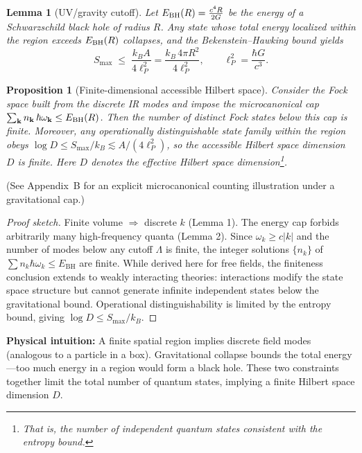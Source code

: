 \documentclass[12pt]{article}
\newcommand{\Smax}{S_{\max}}
\newtheorem{lemma}{Lemma}
\newtheorem{proposition}{Proposition}
\theoremstyle{remark}
\begin{document}
\begin{lemma}[UV/gravity cutoff]\label{lem:UV}
Let $E_{\rm BH}(R)=\frac{c^4 R}{2G}$ be the energy of a Schwarzschild black hole of radius $R$. 
Any state whose total energy localized within the region exceeds $E_{\rm BH}(R)$ collapses, and the
Bekenstein--Hawking bound yields
\begin{equation}
\Smax\;\le\; \frac{k_B A}{4\ell_P^2}
=\frac{k_B\,4\pi R^2}{4\ell_P^2},\qquad \ell_P^2=\frac{\hbar G}{c^3}.
\end{equation}
\end{lemma}

\begin{proposition}[Finite-dimensional accessible Hilbert space]\label{prop:finiteD}
Consider the Fock space built from the discrete IR modes and impose the microcanonical cap 
$\sum_{\mathbf{k}} n_{\mathbf{k}}\,\hbar\omega_{\mathbf{k}}\le E_{\rm BH}(R)$. 
Then the number of distinct Fock states below this cap is finite. 
Moreover, any operationally distinguishable state family within the region obeys 
$\log D \le \Smax/k_B \lesssim A/(4\ell_P^2)$, so the accessible Hilbert space dimension $D$ is finite. Here $D$ denotes the effective Hilbert space dimension\footnote{That is, the number of independent quantum states consistent with the entropy bound.}.

\end{proposition}
\noindent(See Appendix~B for an explicit microcanonical counting illustration under a gravitational cap.)

\begin{proof}[Proof sketch]
Finite volume $\Rightarrow$ discrete $k$ (Lemma 1). The energy cap forbids arbitrarily 
many high-frequency quanta (Lemma 2). Since $\omega_k \geq c|k|$ and the number of modes 
below any cutoff $\Lambda$ is finite, the integer solutions $\{n_k\}$ of 
$\sum n_k \hbar \omega_k \leq E_{\mathrm{BH}}$ are finite. While derived here for free 
fields, the finiteness conclusion extends to weakly interacting theories: interactions 
modify the state space structure but cannot generate infinite independent states below 
the gravitational bound. Operational distinguishability is limited by the entropy bound, 
giving $\log D \leq S_{\max}/k_B$.
\end{proof}

\textbf{Physical intuition:} A finite spatial region implies discrete field modes (analogous to a particle in a box). 
Gravitational collapse bounds the total energy---too much energy in a region would form a black hole. 
These two constraints together limit the total number of quantum states, implying a finite Hilbert space dimension $D$.
\end{document}
